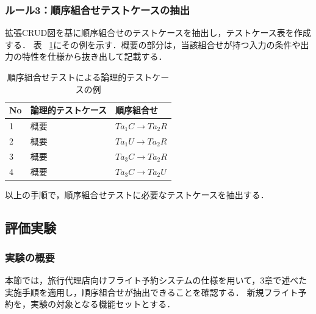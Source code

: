 \documentclass[10pt,a4j]{jarticle}
\begin{document}
\subsubsection{ルール3：順序組合せテストケースの抽出}
拡張CRUD図を基に順序組合せのテストケースを抽出し，テストケース表を作成する．
表 ~\ref{TCLISTSAMPLE}にその例を示す．概要の部分は，当該組合せが持つ入力の条件や出力の特性を仕様から抜き出して記載する．



\begin{table}[t]
  \centering
  \caption{順序組合せテストによる論理的テストケースの例}
    \begin{tabular}{l|l|l}
    No & 論理的テストケース & 順序組合せ \\
    \hline
    1 & 概要 & $Ta_1C \rightarrow Ta_2R$ \\
    \hline
    2 & 概要 & $Ta_1U \rightarrow Ta_2R$ \\
    \hline
    3 & 概要 & $Ta_3C \rightarrow Ta_2R$ \\
    \hline
    4 & 概要 & $Ta_3C \rightarrow Ta_2U$ \\
    \hline
    \end{tabular}%
\label{TCLISTSAMPLE}
\end{table}%
以上の手順で，順序組合せテストに必要なテストケースを抽出する．

\subsection{評価実験} \label{sec:5-3}
\subsubsection{実験の概要} \label{sec:5-3-1}

本節では，旅行代理店向けフライト予約システムの仕様を用いて，3章で述べた実施手順を適用し，順序組合せが抽出できることを確認する．
新規フライト予約を，実験の対象となる機能セットとする．
\end{document}
